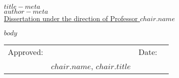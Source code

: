 \documentclass{article}
\begin{document}
\doublespacing
\begin{center}
    $title-meta$\\[1.5em]

    $author-meta$\\[1.5em]

\underline{Dissertation under the direction of Professor $chair.name$}

$body$

\vfill
\begin{tabular}{@{}p{0.5in}p{2.5in}p{0.3in}p{1in}@{}}
    Approved: & \hrulefill & Date: & \hrulefill \\
              & $chair.name$, $chair.title$ & & \\
\end{tabular}
\end{center}
\end{document}
